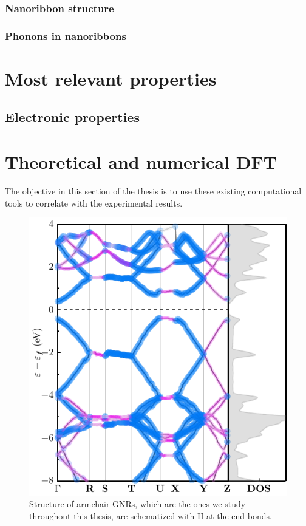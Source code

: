 \subsubsection{Nanoribbon structure}

\subsubsection{Phonons in nanoribbons}

\section{Most relevant properties}




















\subsection{Electronic properties}

\section{Theoretical and numerical DFT}
\vspace{-1cm}
The objective in this section of the thesis is to use these existing computational tools to correlate with the experimental results.



\begin{figure}[h!]
	\centering
	\includegraphics[width=0.80\linewidth]{FIGURES/Physical_Background/PLOT-GNRS007}
	\caption{Structure of armchair GNRs, which are the ones we study throughout this thesis, are schematized with H at the end bonds. }
	\label{fig:introfig32}
\end{figure}


